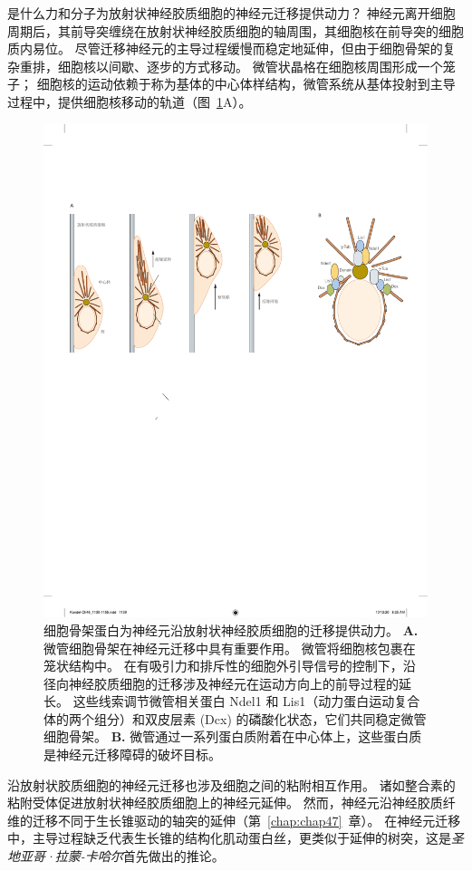 是什么力和分子为放射状神经胶质细胞的神经元迁移提供动力？
神经元离开细胞周期后，其前导突缠绕在放射状神经胶质细胞的轴周围，其细胞核在前导突的细胞质内易位。
尽管迁移神经元的主导过程缓慢而稳定地延伸，但由于细胞骨架的复杂重排，细胞核以间歇、逐步的方式移动。 
微管状晶格在细胞核周围形成一个笼子；
细胞核的运动依赖于称为基体的中心体样结构，微管系统从基体投射到主导过程中，提供细胞核移动的轨道（图~\ref{fig:46_7}A）。


\begin{figure}[htbp]
	\centering
	\includegraphics[width=0.8\linewidth]{chap46/fig_46_7}
	\caption{细胞骨架蛋白为神经元沿放射状神经胶质细胞的迁移提供动力。
		\textbf{A.} 微管细胞骨架在神经元迁移中具有重要作用。
		微管将细胞核包裹在笼状结构中。
		在有吸引力和排斥性的细胞外引导信号的控制下，沿径向神经胶质细胞的迁移涉及神经元在运动方向上的前导过程的延长。
		这些线索调节微管相关蛋白 Ndel1 和 Lis1（动力蛋白运动复合体的两个组分）和双皮层素 (Dcx) 的磷酸化状态，它们共同稳定微管细胞骨架\cite{gleeson2000neuronal}。
		\textbf{B.} 微管通过一系列蛋白质附着在中心体上，这些蛋白质是神经元迁移障碍的破坏目标。}
	\label{fig:46_7}
\end{figure}


沿放射状胶质细胞的神经元迁移也涉及细胞之间的粘附相互作用。
诸如整合素的粘附受体促进放射状神经胶质细胞上的神经元延伸。
然而，神经元沿神经胶质纤维的迁移不同于生长锥驱动的轴突的延伸（第~\ref{chap:chap47}~章）。
在神经元迁移中，主导过程缺乏代表生长锥的结构化肌动蛋白丝，更类似于延伸的树突，这是\textit{圣地亚哥·拉蒙-卡哈尔}首先做出的推论。


